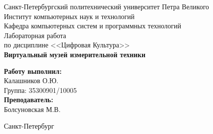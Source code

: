 \begin{titlepage}
    \begin{center}
        \large Санкт-Петербургский политехнический университет Петра Великого\\
        \large Институт компьютерных наук и технологий \\
        \large Кафедра компьютерных систем и программных технологий\\[6cm]


        \huge Лабораторная работа\\[0.5cm]
        \large по дисциплине <<Цифровая Культура>>\\[0.1cm]
        \large\textbf{Виртуальный музей измерительной техники}\\[5cm]
    \end{center}


    \begin{flushright}
        \begin{minipage}{0.25\textwidth}
            \begin{flushleft}

                \large\textbf{Работу выполнил:}\\
                \large Калашников О.Ю.\\
                \large {Группа:} 35300901/10005\\

                \large \textbf{Преподаватель:}\\
                \large Болсуновская М.В.

            \end{flushleft}
        \end{minipage}
    \end{flushright}

    \vfill

    \begin{center}
        \large Санкт-Петербург\\
        \large \the\year
    \end{center}
\end{titlepage}

\vfill
\newpage